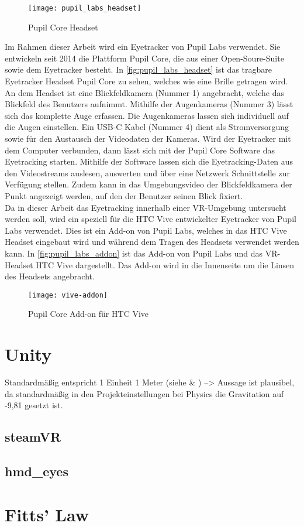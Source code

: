 \begin{figure}[!htbp]
	\centering
	\texttt{[image: pupil\_labs\_headset]}
	\caption[Pupil Core Headset]{Pupil Core Headset \cite{PupilLabsHW}}
	\label{fig:pupil_labs_headset}
\end{figure}

Im Rahmen dieser Arbeit wird ein Eyetracker von Pupil Labs verwendet. Sie entwickeln seit 2014 die Plattform Pupil Core, die aus einer Open-Soure-Suite sowie dem Eyetracker besteht. In \autoref{fig:pupil_labs_headset} ist das tragbare Eyetracker Headset Pupil Core zu sehen, welches wie eine Brille getragen wird. An dem Headset ist eine Blickfeldkamera (Nummer 1) angebracht, welche das Blickfeld des Benutzers aufnimmt.  Mithilfe der Augenkameras (Nummer 3) lässt sich das komplette Auge erfassen. Die Augenkameras lassen sich individuell auf die Augen einstellen. Ein USB-C Kabel (Nummer 4) dient als Stromversorgung sowie für den Austausch der Videodaten der Kameras. Wird der Eyetracker mit dem Computer verbunden, dann lässt sich mit der Pupil Core Software das Eyetracking starten. Mithilfe der Software lassen sich die Eyetracking-Daten aus den Videostreams auslesen, auswerten und über eine Netzwerk Schnittstelle zur Verfügung stellen. Zudem kann in das Umgebungsvideo der Blickfeldkamera der Punkt angezeigt werden, auf den der Benutzer seinen Blick fixiert. \\
Da in dieser Arbeit das Eyetracking innerhalb einer \ac{VR}-Umgebung untersucht werden soll, wird ein speziell für die HTC Vive entwickelter Eyetracker von Pupil Labs verwendet. Dies ist ein Add-on von Pupil Labs, welches in das HTC Vive Headset eingebaut wird und während dem Tragen des Headsets verwendet werden kann. In \autoref{fig:pupil_labs_addon} ist das Add-on von Pupil Labs und das \ac{VR}-Headset HTC Vive dargestellt. Das Add-on wird in die Innenseite um die Linsen des Headsets angebracht. 

\begin{figure}[!htbp]
	\centering
	\texttt{[image: vive-addon]}
	\caption[Pupil Core Add-on für HTC Vive]{Pupil Core Add-on für HTC Vive \cite{PupilLabsAddOn}}
	\label{fig:pupil_labs_addon}
\end{figure}

\cite{Clay_Koenig_Koenig_2019}

\cite{Kassner_2014}

\section{Unity}
Standardmäßig entspricht 1 Einheit 1 Meter (siehe \cite{BrentAllard.2017} \& \cite{AVividLight.2010}) --> Aussage ist plausibel, da standardmäßig in den Projekteinstellungen bei Physics die Gravitation auf -9,81 gesetzt ist.

\subsection{steamVR}

\subsection{hmd\_eyes}

\section{Fitts' Law}
